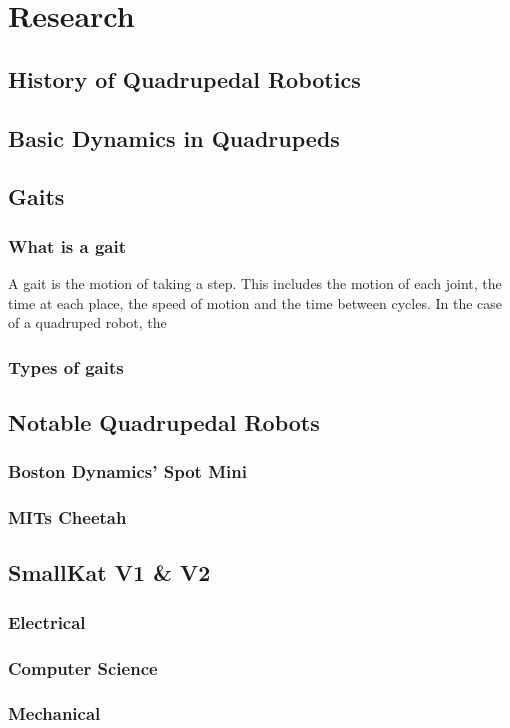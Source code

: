 \section{Research}
\subsection{History of Quadrupedal Robotics}


\subsection{Basic Dynamics in Quadrupeds}


\subsection{Gaits}
    \subsubsection{What is a gait}
    A gait is the motion of taking  a step. This includes the motion of each joint, the time at each place, the speed of motion and the time between cycles. In the case of a quadruped robot, the 
    
    \subsubsection{Types of gaits}
    
\subsection{Notable Quadrupedal Robots}
    \subsubsection{Boston Dynamics’ Spot Mini}
    
    \subsubsection{MITs Cheetah}
    
    
\subsection{SmallKat V1 \& V2}
    \subsubsection{Electrical}
    
    \subsubsection{Computer Science}
    
    \subsubsection{Mechanical}



